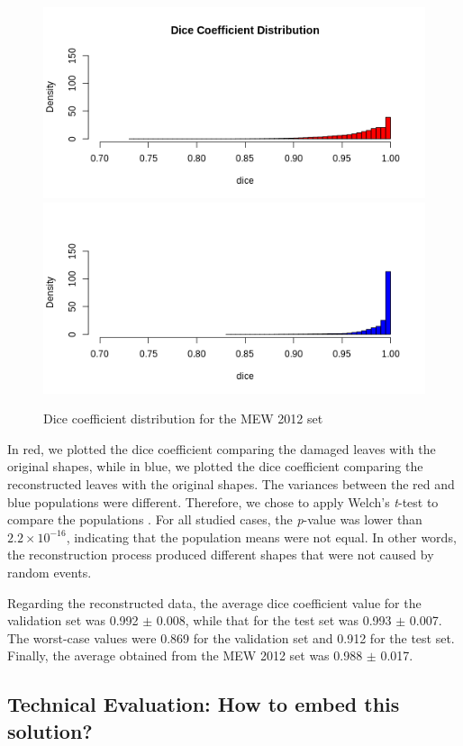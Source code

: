 \begin{figure}[h!]
    \centering
    \includegraphics[width=.65\linewidth]{Figures/v2-mew2012-dicedst-d.png}
    \includegraphics[width=.65\linewidth]{Figures/v2-mew2012-dicedst-r.png}
    \caption{Dice coefficient distribution for the MEW 2012 set}
    \label{fig:mew2012-dice-dist}
\end{figure}

In red, we plotted the dice coefficient comparing the damaged leaves with the original shapes, while in blue, we plotted the dice coefficient comparing the reconstructed leaves with the original shapes. The variances between the red and blue populations were different. Therefore, we chose to apply Welch's \textit{t}-test to compare the populations \cite{salkind2010encyclopedia}. For all studied cases, the \textit{p}-value was lower than $2.2 \times 10^{-16}$, indicating that the population means were not equal. In other words, the reconstruction process produced different shapes that were not caused by random events.

Regarding the reconstructed data, the average dice coefficient value for the validation set was 0.992 $\pm$ 0.008, while that for the test set was 0.993 $\pm$ 0.007. The worst-case values were 0.869 for the validation set and 0.912 for the test set. Finally, the average obtained from the MEW 2012 set was 0.988 $\pm$ 0.017.

\subsection{Technical Evaluation: How to embed this solution?}

